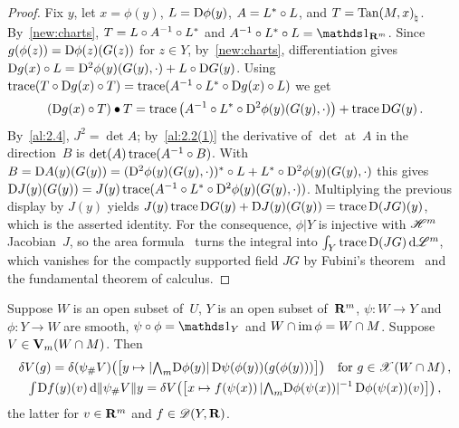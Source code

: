 \begin{proof}
    Fix $y$, let $x = \phi(y)$, $L = \mathrm{D} \phi(y)$, $A = L^{*} \circ L$, and $T =
    {\operatorname{Tan}(M,x)}_\natural$. By~\ref{new:charts}, $T = L \circ A^{-1} \circ L^{*}$ and
    $A^{-1} \circ \transpose{L} \circ L = \id{\R^m}$. Since $g(\phi(z)) = \mathrm{D} \phi(z)(G(z))$ for $z \in Y$, by~\ref{new:charts},
    differentiation gives $\mathrm{D} g(x) \circ L =
    \mathrm{D}^2\phi(y)(G(y),\cdot) + L \circ \mathrm{D} G(y)$. Using $\operatorname{trace}(T \circ \mathrm{D} g(x) \circ T) =
    \operatorname{trace}(A^{-1} \circ L^{*} \circ \mathrm{D} g(x) \circ L)$ we get
    \begin{displaymath}
        (\mathrm{D} g(x) \circ T) \bullet T = \operatorname{trace} \big( A^{-1} \circ L^{*} \circ
        \mathrm{D}^2\phi(y)(G(y),\cdot) \big) + \operatorname{trace} \mathrm{D} G(y) \,.
    \end{displaymath}
    By~\ref{al:2.4}, $J^2 = \det A$; by~\ref{al:2.2(1)} the derivative of $\det$ at~$A$ in the
    direction~$B$ is $\det(A) \operatorname{trace}(A^{-1} \circ B)$. With $B = \mathrm{D} A(y)(G(y)) =
    (\mathrm{D}^2 \phi(y)(G(y),\cdot))^{*} \circ L + L^{*} \circ \mathrm{D}^2\phi(y)(G(y),\cdot)$
    this gives $\mathrm{D} J(y)(G(y)) = J(y) \operatorname{trace}(A^{-1} \circ L^{*} \circ
    \mathrm{D}^2\phi(y)(G(y),\cdot))$. Multiplying the previous display by $J(y)$ yields $J(y) \operatorname{trace}
    \mathrm{D} G(y) + \mathrm{D} J(y)(G(y)) = \operatorname{trace} \mathrm{D} (J G)(y)$, which is the asserted identity. For the
    consequence, $\phi | Y$ is injective with $\mathscr{H}^m$ Jacobian~$J$, so the area
    formula~\cite[3.2.3, 3.2.5]{Federer1969} turns the integral into ${\textstyle\int_{Y}^{}} \operatorname{trace} \mathrm{D}
    (JG) \,\mathrm{d} \mathscr{L}^m$, which vanishes for the compactly supported field $JG$ by Fubini's
    theorem~\cite[2.6.2]{Federer1969} and the fundamental theorem of calculus.
\end{proof}

\begin{lemma}
    \label{al:4.5}
    Suppose $W$ is an open subset of~$U$, $Y$ is an open subset of~$\mathbf{R}^m$, $\psi : W \to Y$ and
    $\phi : Y \to W$ are smooth, $\psi \circ \phi = \id{Y}$ and $W \cap \operatorname{im} \phi = W \cap M$.
    Suppose $V \in \mathbf{V}_{m}(W \cap M)$. Then
    \begin{gather*}
        \delta V(g) = \delta(\psi_\# V) \big( \big[ y \mapsto |{\textstyle\boldsymbol{\bigwedge}}_{{m}} \mathrm{D} \phi(y)| \, \mathrm{D}
        \psi(\phi(y))(g(\phi(y))) \big] \big) \quad \text{for $g \in \mathscr{X}(W \cap M)$} \,, \\
        {\textstyle\int_{}^{}} \mathrm{D} f(y)(v) \,\mathrm{d} \|\psi_\# V\| y = \delta V \big( \big[ x \mapsto f(\psi(x)) \,
        |{\textstyle\boldsymbol{\bigwedge}}_{{m}} \mathrm{D} \phi(\psi(x))|^{-1} \, \mathrm{D} \phi(\psi(x))(v) \big] \big) \,,
    \end{gather*}
    the latter for $v \in \mathbf{R}^m$ and $f \in \mathscr{D}(Y,\mathbf{R})$.
\end{lemma}

